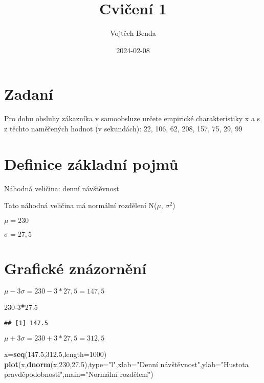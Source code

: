 \documentclass[
]{article}
\title{Cvičení 1}
\author{Vojtěch Benda}
\date{2024-02-08}
\newenvironment{Shaded}{\begin{snugshade}}{\end{snugshade}}
\newcommand{\AttributeTok}[1]{\textcolor[rgb]{0.13,0.29,0.53}{#1}}
\newcommand{\DecValTok}[1]{\textcolor[rgb]{0.00,0.00,0.81}{#1}}
\newcommand{\FloatTok}[1]{\textcolor[rgb]{0.00,0.00,0.81}{#1}}
\newcommand{\FunctionTok}[1]{\textcolor[rgb]{0.13,0.29,0.53}{\textbf{#1}}}
\newcommand{\NormalTok}[1]{#1}
\newcommand{\OtherTok}[1]{\textcolor[rgb]{0.56,0.35,0.01}{#1}}
\newcommand{\SpecialCharTok}[1]{\textcolor[rgb]{0.81,0.36,0.00}{\textbf{#1}}}
\newcommand{\StringTok}[1]{\textcolor[rgb]{0.31,0.60,0.02}{#1}}
\begin{document}
\maketitle

\section{Zadaní}\label{zadanuxed}

Pro dobu obsluhy zákazníka v samoobsluze určete empirické
charakteristiky x a s z těchto naměřených hodnot (v sekundách): 22, 106,
62, 208, 157, 75, 29, 99

\section{Definice základní
pojmů}\label{definice-zuxe1kladnuxed-pojmux16f}

Náhodná veličina: denní návštěvnost

Tato náhodná veličina má normální rozdělení N(\(\mu\), \(\sigma^2\))

\(\mu=230\)

\(\sigma=27,5\)

\section{Grafické znázornění}\label{grafickuxe9-znuxe1zornux11bnuxed}

\(\mu-3\sigma=230-3*27,5=147,5\)

\begin{Shaded}
\begin{Highlighting}[]
\DecValTok{230{-}3}\SpecialCharTok{*}\FloatTok{27.5}
\end{Highlighting}
\end{Shaded}

\begin{verbatim}
## [1] 147.5
\end{verbatim}

\(\mu+3\sigma=230+3*27,5=312,5\)

\begin{Shaded}
\begin{Highlighting}[]
\NormalTok{x}\OtherTok{=}\FunctionTok{seq}\NormalTok{(}\FloatTok{147.5}\NormalTok{,}\FloatTok{312.5}\NormalTok{,}\AttributeTok{length=}\DecValTok{1000}\NormalTok{)}
\FunctionTok{plot}\NormalTok{(x,}\FunctionTok{dnorm}\NormalTok{(x,}\DecValTok{230}\NormalTok{,}\FloatTok{27.5}\NormalTok{),}\AttributeTok{type=}\StringTok{"l"}\NormalTok{,}\AttributeTok{xlab=}\StringTok{"Denní návštěvnost"}\NormalTok{,}\AttributeTok{ylab=}\StringTok{"Hustota pravděpodobnosti"}\NormalTok{,}\AttributeTok{main=}\StringTok{"Normální rozdělení"}\NormalTok{)}
\end{Highlighting}
\end{Shaded}
\end{document}

